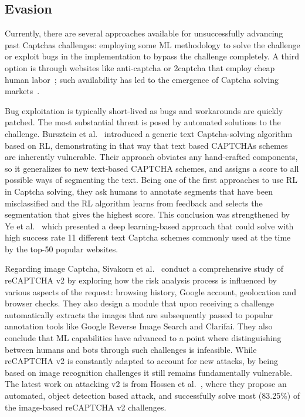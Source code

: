 \subsection{Evasion}

Currently, there are several approaches available for unsuccessfully advancing past Captchas challenges: employing some \gls{ML} methodology to solve the challenge or exploit bugs in the implementation to bypass the challenge completely.
A third option is through websites like anti-captcha or 2captcha that employ cheap human labor~\cite{weng2019towards}; such availability has led to the emergence of Captcha solving markets~\cite{motoyama2010re}.

Bug exploitation is typically short-lived as bugs and workarounds are quickly patched.
The most substantial threat is posed by automated solutions to the challenge.
Bursztein et al.~\cite{bursztein2014end} introduced a generic text Captcha-solving algorithm based on \gls{RL}, demonstrating in that way that text based CAPTCHAs schemes are inherently vulnerable.
Their approach obviates any hand-crafted components, so it generalizes to new text-based CAPTCHA schemes, and assigns a score to all possible ways of segmenting the text.
Being one of the first approaches to use \gls{RL} in Captcha solving, they ask humans to annotate segments that have been misclassified and the \gls{RL} algorithm learns from feedback and selects the segmentation that gives the highest score.
This conclusion was strengthened by Ye et al.~\cite{ye2018yet} which presented a deep learning-based approach that could solve with high success rate 11 different text Captcha schemes commonly used at the time by the top-50 popular websites.

Regarding image Captcha, Sivakorn et al.~\cite{sivakorn2016robot} conduct a comprehensive study of reCAPTCHA v2 by exploring how the risk analysis process is influenced by various aspects of the request: browsing history, Google account, geolocation and browser checks.
They also design a module that upon receiving a challenge automatically extracts the images that are subsequently passed to popular annotation tools like Google Reverse Image Search and Clarifai.
They also conclude that \gls{ML} capabilities have advanced to a point where distinguishing between humans and bots through such challenges is infeasible.
While reCAPTCHA v2 is constantly adapted to account for new attacks, by being based on image recognition challenges it still remains fundamentally vulnerable.
The latest work on attacking v2 is from Hossen et al.~\cite{hossen2020object}, where they propose an automated, object detection based attack, and successfully solve most (83.25\%) of the image-based reCAPTCHA v2 challenges.


